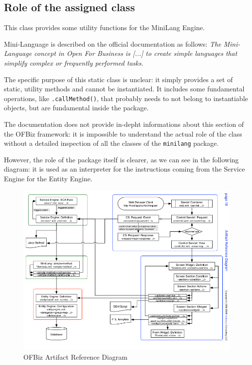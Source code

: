\documentclass[11pt]{article} %
\begin{document}
\subsection{Role of the assigned class}
This class provides some utility functions for the MiniLang Engine.

Mini-Language is described on the official documentation as follows: \textit{The Mini-Language concept in Open For Business is [...] to create simple languages that simplify complex or frequently performed tasks.}

The specific purpose of this static class is unclear: it simply provides a set of static, utility methods and cannot be instantiated. It includes some fundamental operations, like \texttt{.callMethod()}, that probably needs to not belong to instantiable objects, but are fundamental inside the package.

The documentation does not provide in-depht informations about this section of the OFBiz framework: it is impossible to understand the actual role of the class without a detailed inspection of all the classes of the \texttt{minilang} package.

However, the role of the package itself is clearer, as we can see in the following diagram: it is used as an interpreter for the instructions coming from the Service Engine for the Entity Engine.

\begin{figure}[H]
	\centering
	\includegraphics[width=1
\textwidth]{Diagram1.png}
	\caption{OFBiz Artifact Reference Diagram}
\end{figure}
\end{document}
